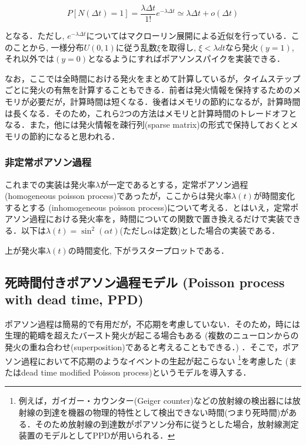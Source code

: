 \begin{equation}
P[N(\Delta t)=1]=\dfrac{\lambda \Delta t}{1 !} e^{-\lambda \Delta t}\simeq \lambda \Delta t+o(\Delta t)
\end{equation}


となる．ただし, $e^{-\lambda \Delta t}$についてはマクローリン展開による近似を行っている．このことから, 一様分布$U(0,1)$に従う乱数$\xi$を取得し, $\xi<\lambda dt$なら発火$(y=1)$, それ以外では$(y=0)$となるようにすればポアソンスパイクを実装できる．




なお，ここでは全時間における発火をまとめて計算しているが，タイムステップごとに発火の有無を計算することもできる．前者は発火情報を保持するためのメモリが必要だが，計算時間は短くなる．後者はメモリの節約になるが，計算時間は長くなる．そのため，これら2つの方法はメモリと計算時間のトレードオフとなる．また，他には発火情報を疎行列(sparse matrix)の形式で保持しておくとメモリの節約になると思われる．
\subsubsection{非定常ポアソン過程}
これまでの実装は発火率$\lambda$が一定であるとする，定常ポアソン過程 (homogeneous poisson process)であったが，ここからは発火率$\lambda(t)$が時間変化するとする\textbf{} (inhomogeneous poisson process)について考える．とはいえ，定常ポアソン過程における発火率を，時間についての関数で置き換えるだけで実装できる．以下は$\lambda(t)=\sin^2(\alpha t)$(ただし$\alpha$は定数)とした場合の実装である．


上が発火率$\lambda(t)$の時間変化, 下がラスタープロットである．
\subsection{死時間付きポアソン過程モデル (Poisson process with dead time, PPD)}
ポアソン過程は簡易的で有用だが，不応期を考慮していない．そのため，時には生理的範疇を超えたバースト発火が起こる場合もある (複数のニューロンからの発火の重ね合わせ(superposition)であると考えることもできる．) ．そこで，ポアソン過程において不応期のようなイベントの生起が起こらない \textbf{} \footnote{例えば，ガイガー・カウンター(Geiger counter)などの放射線の検出器には放射線の到達を機器の物理的特性として検出できない時間(つまり死時間)がある．そのため放射線の到達数がポアソン分布に従うとした場合，放射線測定装置のモデルとしてPPDが用いられる．}を考慮した\textbf{} (またはdead time modified Poisson process)というモデルを導入する．

